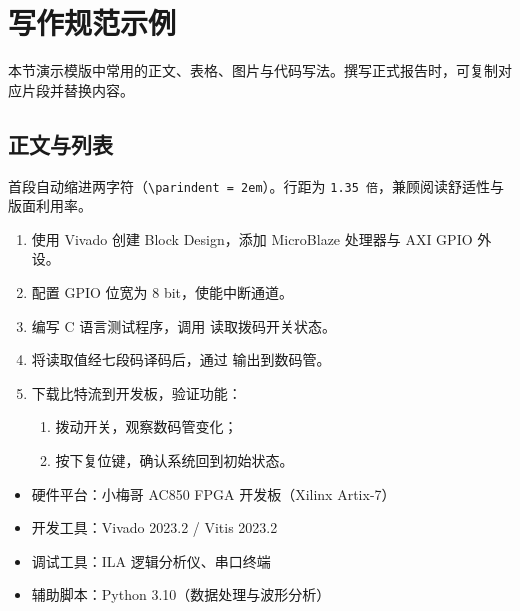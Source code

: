 \documentclass[a4paper,12pt]{article}
\begin{document}


\begin{center}
    \tableofcontents
\end{center}
\newpage



\section{写作规范示例}

本节演示模版中常用的正文、表格、图片与代码写法。撰写正式报告时，可复制对应片段并替换内容。

\subsection{正文与列表}
\label{sec:demo-text}

首段自动缩进两字符（\texttt{\textbackslash parindent = 2em}）。行距为 \texttt{1.35 倍}，兼顾阅读舒适性与版面利用率。

\begin{enumerate}
    \item 使用 Vivado 创建 Block Design，添加 MicroBlaze 处理器与 AXI GPIO 外设。
    \item 配置 GPIO 位宽为 8 bit，使能中断通道。
    \item 编写 C 语言测试程序，调用  读取拨码开关状态。
    \item 将读取值经七段码译码后，通过  输出到数码管。
    \item 下载比特流到开发板，验证功能：
    \begin{enumerate}
        \item 拨动开关，观察数码管变化；
        \item 按下复位键，确认系统回到初始状态。
    \end{enumerate}
\end{enumerate}

\begin{itemize}
    \item 硬件平台：小梅哥 AC850 FPGA 开发板（Xilinx Artix-7）
    \item 开发工具：Vivado 2023.2 / Vitis 2023.2
    \item 调试工具：ILA 逻辑分析仪、串口终端
    \item 辅助脚本：Python 3.10（数据处理与波形分析）
\end{itemize}
\end{document}

